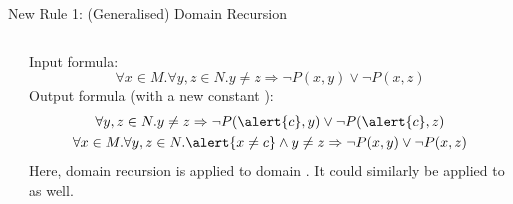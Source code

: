 \documentclass{beamer}
\begin{document}
\begin{frame}{New Rule 1: (Generalised) Domain Recursion}
  \begin{columns}
    \begin{column}{0.20\textwidth}
      \centering
    \end{column}
    \begin{column}{0.8\textwidth}
      \begin{example}
        Input formula:
        \[
        \forall x \in M. \forall y, z \in N. y \ne z \Rightarrow \neg P(x, y) \lor \neg P(x, z)
        \]
        Output formula (with a new constant ):
        \begin{gather*}
          \forall y, z \in N. y \ne z \Rightarrow \neg P(\alert{c}, y) \lor \neg P(\alert{c}, z) \\
          \forall x \in M. \forall y, z \in N. \alert{x \ne c} \land y \ne z \Rightarrow \neg P(x, y) \lor \neg P(x, z)
        \end{gather*}
        Here, domain recursion is applied to domain . It could similarly be applied to  as well.
      \end{example}
    \end{column}
  \end{columns}
\end{frame}
\end{document}
